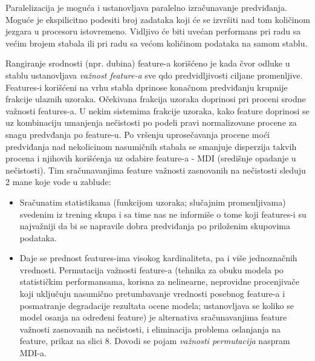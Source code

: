 \documentclass[fontsize=12bp, paper=a4]{scrarticle}
\begin{document}
Paralelizacija je moguća i ustanovljava paralelno izračunavanje predviđanja. Moguće je ekspilicitno podesiti broj zadataka koji će se izvršiti nad tom količinom jezgara u procesoru istovremeno. Vidljivo će biti uvećan performans pri radu sa većim brojem stabala ili pri radu sa većom količinom podataka na samom stablu.

Rangiranje srodnosti (npr. dubina) feature-a korišćeno je kada čvor odluke u stablu ustanovljava \textit{važnost feature-a} sve qdo predvidljivosti ciljane promenljive. Features-i korišćeni na vrhu stabla dprinose konačnom predviđanju krupnije frakcije ulaznih uzoraka. Očekivana frakcija uzoraka doprinosi pri proceni srodne važnosti features-a. U nekim sistemima frakcije uzoraka, kako feature doprinosi se uz kombinaciju umanjenja nečistosti po podeli pravi normalizovane procene za snagu predvđanja po feature-u. Po vršenju uprosečavanja procene moći predviđanja nad nekolicinom nasumičnih stabala se smanjuje disperzija takvih procena i njihovih korišćenja uz odabire feature-a - MDI (središnje opadanje u nečistosti).
Tim sračunavanjima feature važnosti zasnovanih na nečistosti sleduju 2 mane koje vode u zablude:
\begin{itemize}
    \item Sračunatim statistikama (funkcijom uzoraka; slučajnim promenljivama) svedenim iz trening skupa i sa time nas ne informiše o tome koji features-i su najvažniji da bi se napravile dobra predviđanja po priloženim skupovima podataka.
    \item Daje se prednost features-ima visokog kardinaliteta, pa i više jednoznačnih vrednosti. Permutacija važnosti feature-a (tehnika za obuku modela po statističkim performansama, korisna za nelinearne, neprovidne procenjivače koji uključuju nasumično pretumbavanje vrednosti posebnog feature-a i posmatranje degradacije rezultata ocene modela; ustanovljava se koliko se model osanja na određeni feature)\cite{permutation} je alternativa sračunavanjima feature važnosti zasnovanih na nečistosti, i eliminacija problema oslanjanja na feature, prikaz na slici 8. Dovodi se pojam \textit{važnosti permutacija} naspram MDI-a.
\end{itemize}
\end{document}
